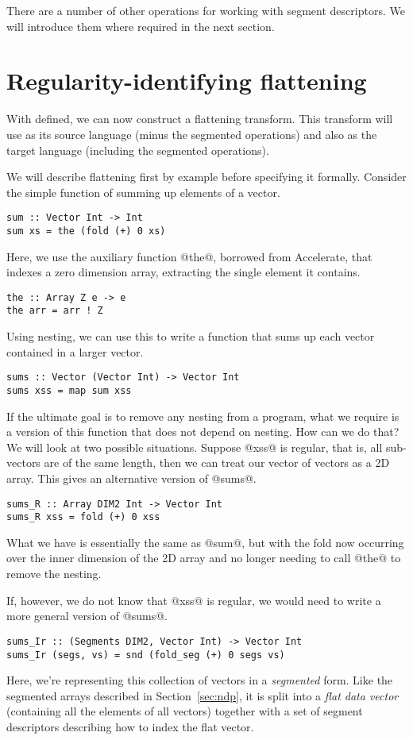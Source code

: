 There are a number of other operations for working with segment descriptors. We will introduce them where required in the next section.


\section{Regularity-identifying flattening}
\label{sec:flattening}

With \ndp{} defined, we can now construct a flattening transform. This transform will use \ndp{} as its source language (minus the segmented operations) and also as the target language (including the segmented operations).

We will describe flattening first by example before specifying it formally. Consider the simple function of summing up elements of a vector.
%
\begin{lstlisting}[style=ndp]
sum :: Vector Int -> Int
sum xs = the (fold (+) 0 xs)
\end{lstlisting}
%
Here, we use the auxiliary function @the@, borrowed from Accelerate, that indexes a zero dimension array, extracting the single element it contains.
%
\begin{lstlisting}[style=ndp]
the :: Array Z e -> e
the arr = arr ! Z
\end{lstlisting}
%
Using nesting, we can use this to write a function that sums up each vector contained in a larger vector.
%
\begin{lstlisting}[style=ndp]
sums :: Vector (Vector Int) -> Vector Int
sums xss = map sum xss
\end{lstlisting}
%
If the ultimate goal is to remove any nesting from a program, what we require is a version of this function that does not depend on nesting. How can we do that? We will look at two possible situations. Suppose @xss@ is regular, that is, all sub-vectors are of the same length, then we can treat our vector of vectors as a 2D array. This gives an alternative version of @sums@.
%
\begin{lstlisting}[style=ndp]
sums_R :: Array DIM2 Int -> Vector Int
sums_R xss = fold (+) 0 xss
\end{lstlisting}
%
What we have is essentially the same as @sum@, but with the fold now occurring over the inner dimension of the 2D array and no longer needing to call @the@ to remove the nesting.

If, however, we do not know that @xss@ is regular, we would need to write a more general version of @sums@.
%
\begin{lstlisting}[style=ndp]
sums_Ir :: (Segments DIM2, Vector Int) -> Vector Int
sums_Ir (segs, vs) = snd (fold_seg (+) 0 segs vs)
\end{lstlisting}
%
Here, we're representing this collection of vectors in a \emph{segmented} form. Like the segmented arrays described in Section~\ref{sec:ndp}, it is split into a \emph{flat data vector} (containing all the elements of all vectors) together with a set of segment descriptors describing how to index the flat vector.

